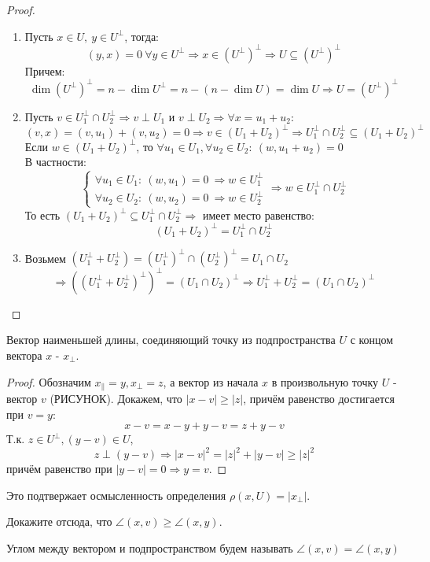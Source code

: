 \begin{proof}\tab
    \begin{enumerate}
        \item Пусть $x\in U,\ y\in U^\perp$, тогда: 
        $$(y,x)=0\ \forall y\in U^\perp \Rightarrow x\in (U^\perp)^\perp \Longrightarrow  U\subseteq (U^\perp)^\perp$$ 
        Причем: 
        $$\dim{(U^\perp)^\perp}=n-\dim{U^\perp}=n-(n-\dim{U})=\dim{U}\Longrightarrow  U=(U^\perp)^\perp$$

        \item Пусть $v\in U_1^\perp\cap U_2^\perp \Longrightarrow  v\perp U_1$ и $v\perp U_2 \Longrightarrow  \forall x=u_1+u_2$:
        $$(v,x)=(v,u_1)+(v,u_2)=0 \Longrightarrow  v\in (U_1+U_2)^\perp \Longrightarrow  U_1^\perp \cap U_2^\perp \subseteq (U_1+U_2)^\perp$$
        Если $w\in (U_1+U_2)^\perp$, то $\forall u_1\in U_1, \forall u_2\in U_2 :\ (w, u_1+u_2)=0$\\
        В частности: 
        $$\begin{cases}
            \forall u_1\in U_1: \ (w, u_1)=0 \ \Longrightarrow  w\in U_1^\perp\\
            \forall u_2\in U_2: \ (w, u_2)=0 \ \Longrightarrow  w\in U_2^\perp
        \end{cases} \Longrightarrow  w\in U_1^\perp\cap U_2^\perp$$
        То есть $(U_1+U_2)^\perp \subseteq U_1^\perp \cap U_2^\perp \Longrightarrow $ имеет место равенство:
        $$(U_1+U_2)^\perp=U_1^\perp\cap U_2^\perp$$

        \item Возьмем $(U_1^\perp+U_2^\perp)=(U_1^\perp)^\perp \cap (U_2^\perp)^\perp=U_1 \cap U_2$
        $$\Longrightarrow  ((U_1^\perp+U_2^\perp)^\perp)^\perp=(U_1\cap U_2)^\perp \Longrightarrow  U_1^\perp+U_2^\perp=(U_1 \cap U_2)^\perp$$
    \end{enumerate}
\end{proof}
\begin{subtheorem}
    Вектор наименьшей длины, соединяющий точку из подпространства $U$ с концом вектора $x$ - $x_{\perp}$. 
\end{subtheorem}
\begin{proof}
    Обозначим $x_{\parallel} = y, x_{\perp} = z$, а вектор из начала $x$ в произвольную точку $U$ - вектор $v$ (РИСУНОК). Докажем, что $|x-v|\geqslant |z|$, причём равенство достигается при $v = y$:
    $$x - v = x - y + y - v = z + y - v$$
    Т.к. $z \in U^{\perp}, (y - v) \in U$,
    $$z \perp (y-v) \Rightarrow |x-v|^2 = |z|^2 + |y-v| \geqslant |z|^2$$
    причём равенство при $|y - v| = 0 \Rightarrow y = v$.
\end{proof}
Это подтвержает осмысленность определения $\rho(x, U) = |x_{\perp}|$.
\begin{exercise}
    Докажите отсюда, что $\angle(x, v) \geqslant \angle(x, y)$.
\end{exercise}
\begin{definition}
    Углом между вектором и подпространством будем называть $\angle(x, v) = \angle(x, y)$
\end{definition}

